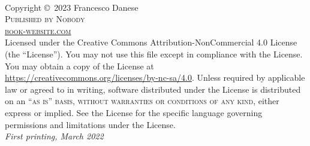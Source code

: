 \documentclass[
	11pt, %
	fleqn, %
	a4paper, %
]{LegrandOrangeBook}
\begin{document}

\thispagestyle{empty} %

~\vfill %

\noindent Copyright \copyright\ 2023 Francesco Danese\\ %

\noindent \textsc{Published by Nobody }\\ %

\noindent \textsc{\href{https://www.latextemplates.com/template/legrand-orange-book}{book-website.com}}\\ %

\noindent Licensed under the Creative Commons Attribution-NonCommercial 4.0 License (the ``License''). You may not use this file except in compliance with the License. You may obtain a copy of the License at \url{https://creativecommons.org/licenses/by-nc-sa/4.0}. Unless required by applicable law or agreed to in writing, software distributed under the License is distributed on an \textsc{``as is'' basis, without warranties or conditions of any kind}, either express or implied. See the License for the specific language governing permissions and limitations under the License.\\ %

\noindent \textit{First printing, March 2022} %


\pagestyle{empty} %

\tableofcontents %

\listoffigures %

\listoftables %

\pagestyle{fancy} %

\cleardoublepage %
\end{document}
